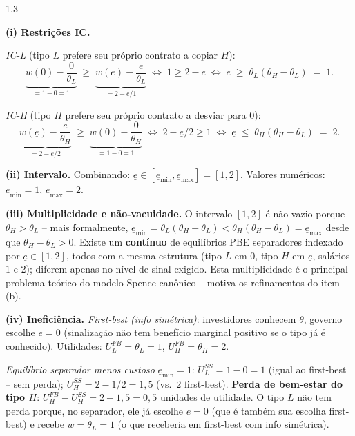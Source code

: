 \documentclass[11pt,addpoints]{exam}
\begin{document}
\begin{spacing}{1.3}
\begin{questions}
\begin{parts}
\begin{solution}
\textbf{(i) Restrições IC.}

\emph{IC-L} (tipo $L$ prefere seu próprio contrato a copiar $H$):
\[
    \underbrace{w(0) - \frac{0}{\theta_L}}_{= 1 - 0 = 1} \;\geq\; \underbrace{w(\underline{e}) - \frac{\underline{e}}{\theta_L}}_{= 2 - \underline{e}/1}
    \;\Longleftrightarrow\; 1 \geq 2 - \underline{e}
    \;\Longleftrightarrow\; \boxed{\underline{e} \;\geq\; \theta_L(\theta_H - \theta_L) \;=\; 1.}
\]

\emph{IC-H} (tipo $H$ prefere seu próprio contrato a desviar para $0$):
\[
    \underbrace{w(\underline{e}) - \frac{\underline{e}}{\theta_H}}_{= 2 - \underline{e}/2} \;\geq\; \underbrace{w(0) - \frac{0}{\theta_H}}_{= 1 - 0 = 1}
    \;\Longleftrightarrow\; 2 - \underline{e}/2 \geq 1
    \;\Longleftrightarrow\; \boxed{\underline{e} \;\leq\; \theta_H(\theta_H - \theta_L) \;=\; 2.}
\]

\textbf{(ii) Intervalo.} Combinando: $\underline{e} \in [\underline{e}_{\min}, \underline{e}_{\max}] = \boxed{[1, 2].}$ Valores numéricos: $\underline{e}_{\min} = 1$, $\underline{e}_{\max} = 2$.

\textbf{(iii) Multiplicidade e não-vacuidade.} O intervalo $[1, 2]$ é não-vazio porque $\theta_H > \theta_L$ -- mais formalmente, $\underline{e}_{\min} = \theta_L(\theta_H - \theta_L) < \theta_H(\theta_H - \theta_L) = \underline{e}_{\max}$ desde que $\theta_H - \theta_L > 0$. Existe um \textbf{contínuo} de equilíbrios PBE separadores indexado por $\underline{e} \in [1, 2]$, todos com a mesma estrutura (tipo $L$ em $0$, tipo $H$ em $\underline{e}$, salários $1$ e $2$); diferem apenas no nível de sinal exigido. Esta multiplicidade é o principal problema teórico do modelo Spence canônico -- motiva os refinamentos do item (b).

\textbf{(iv) Ineficiência.} \emph{First-best (info simétrica)}: investidores conhecem $\theta$, governo escolhe $e = 0$ (sinalização não tem benefício marginal positivo se o tipo já é conhecido). Utilidades: $U^{FB}_L = \theta_L = 1$, $U^{FB}_H = \theta_H = 2$.

\emph{Equilíbrio separador menos custoso} $\underline{e}_{\min} = 1$: $U^{SS}_L = 1 - 0 = 1$ (igual ao first-best -- sem perda); $U^{SS}_H = 2 - 1/2 = 1{,}5$ (vs.\ $2$ first-best). \textbf{Perda de bem-estar do tipo $H$}: $U^{FB}_H - U^{SS}_H = 2 - 1{,}5 = 0{,}5$ unidades de utilidade. O tipo $L$ não tem perda porque, no separador, ele já escolhe $e = 0$ (que é também sua escolha first-best) e recebe $w = \theta_L = 1$ (o que receberia em first-best com info simétrica).


\end{solution}
\end{parts}
\end{questions}
\end{spacing}
\end{document}
